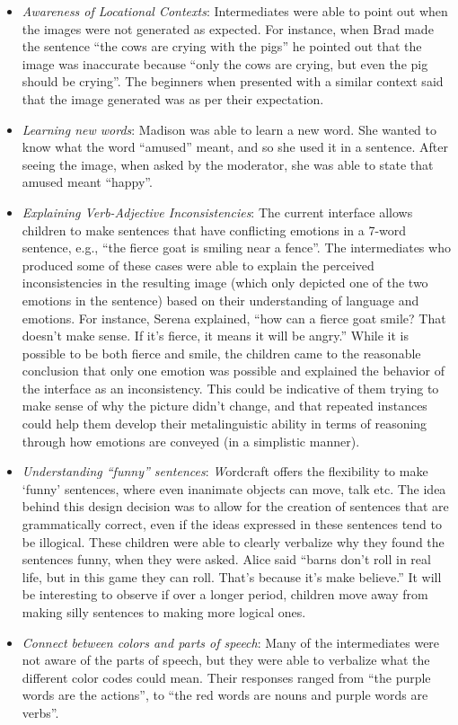 \documentclass{sigchi-ext}
\begin{document}
\begin{itemize}\compresslist
\item 
\emph {Awareness of Locational Contexts}: Intermediates were able to point out when the images were not generated as expected. For instance, when Brad made the sentence “the cows are crying with the pigs” he pointed out that the image was inaccurate because “only the cows are crying, but even the pig should be crying”. The beginners when presented with a similar context said that the image generated was as per their expectation.
\item 	
\emph {Learning new words}: Madison was able to learn a new word. She wanted to know what the word ``amused'' meant, and so she used it in a sentence. After seeing the image, when asked by the moderator, she was able to state that amused meant ``happy''.
\item 	
\emph {Explaining Verb-Adjective Inconsistencies}: The current interface allows children to make sentences that have conflicting emotions in a 7-word sentence, e.g., ``the fierce goat is smiling near a fence''.  The intermediates who produced some of these cases were able to explain the perceived inconsistencies in the resulting image (which only depicted one of the two emotions in the sentence) based on their understanding of language and emotions. For instance, Serena explained, ``how can a fierce goat smile?  That doesn’t make sense. If it’s fierce, it means it will be angry.'' While it is possible to be both fierce and smile, the children came to the reasonable conclusion that only one emotion was possible and explained the behavior of the interface as an inconsistency. This could be indicative of them trying to make sense of why the picture didn’t change, and that repeated instances could help them develop their metalinguistic ability in terms of reasoning through how emotions are conveyed (in a simplistic manner).
\item 	
\emph {Understanding ``funny'' sentences}: \emph Wordcraft offers the flexibility to make ‘funny’ sentences, where even inanimate objects can move, talk etc. The idea behind this design decision was to allow for the creation of sentences that are grammatically correct, even if the ideas expressed in these sentences tend to be illogical. These children were able to clearly verbalize why they found the sentences funny, when they were asked. Alice said  ``barns don’t roll in real life, but in this game they can roll. That’s because it’s make believe.'' It will be interesting to observe if over a longer period, children move away from making silly sentences to making more logical ones. 
\item 	
\emph {Connect between colors and parts of speech}: Many of the intermediates were not aware of the parts of speech, but they were able to verbalize what the different color codes could mean. Their responses ranged from ``the purple words are the actions'', to ``the red words are nouns and purple words are verbs''. 
\end{itemize}
\end{document}
